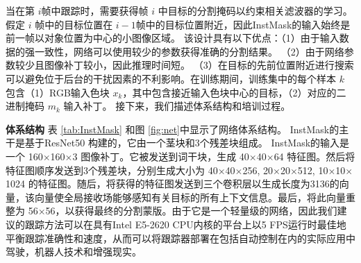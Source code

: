 当在第 $i$帧中跟踪时，需要获得帧 $i$ 中目标的分割掩码以约束相关滤波器的学习。
假定 $i$ 帧中的目标位置在 $i-1$帧中的目标位置附近，因此InstMask的输入始终是前一帧以对象位置为中心的小图像区域。
该设计具有以下优点：（1）由于输入数据的强一致性，网络可以使用较少的参数获得准确的分割结果。 （2）由于网络参数较少且图像补丁较小，因此推理时间短。 （3）在目标的先前位置附近进行搜索可以避免位于后台的干扰因素的不利影响。在训练期间，训练集中的每个样本 $k$ 包含（1）RGB输入色块 $x_k$，其中包含接近输入色块中心的目标，（2）对应的二进制掩码 $m_{k}$ 输入补丁。
接下来，我们描述体系结构和培训过程。

\textbf{体系结构} 表 \ref{tab:InstMask} 和图 \ref{fig:net}中显示了网络体系结构。 InstMask的主干是基于ResNet50 \cite{He2016DeepRL}构建的，它由一个茎块和3个残差块组成。
InstMask的输入是一个 160$\times$160$\times$3 图像补丁。它被发送到词干块，生成 40$\times$40$\times$64 特征图。然后将特征图顺序发送到3个残差块，分别生成大小为 40$\times$40$\times$256, 20$\times$20$\times$512, 10$\times$10$\times$1024 的特征图。随后，将获得的特征图发送到三个卷积层以生成长度为3136的向量，该向量使全局接收场能够感知有关目标的所有上下文信息。最后，将此向量重整为 56$\times$56，以获得最终的分割蒙版。由于它是一个轻量级的网络，因此我们建议的跟踪方法可以在具有Intel E5-2620 CPU内核的平台上以5 FPS运行时最佳地平衡跟踪准确性和速度，从而可以将跟踪器部署在包括自动控制在内的实际应用中驾驶，机器人技术和增强现实。

